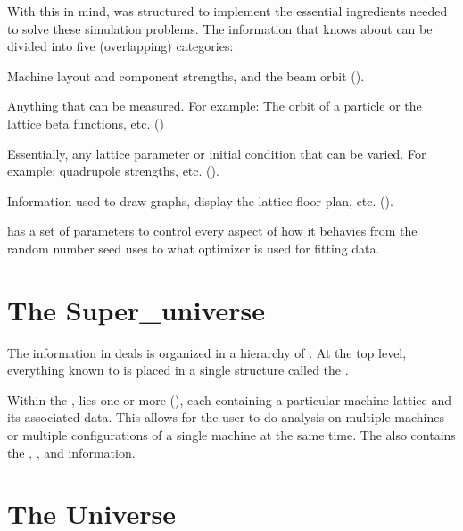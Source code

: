 With this in mind, \tao was structured to implement the essential
ingredients needed to solve these simulation problems.  
The information that \tao knows about can be divided into five
(overlapping) categories:
\begin{description}
  \item[Lattice] \Newline   
Machine layout and component strengths, and the beam orbit ().
  \item[Data] \Newline
Anything that can be measured.
For example: The orbit of a particle or the lattice beta 
functions, etc. ()
  \item[Variables] \Newline
Essentially, any lattice parameter or initial condition that can be varied.
For example: quadrupole strengths, etc. ().
  \item[Plotting]  \Newline
Information used to draw graphs, display the lattice 
floor plan, etc. ().
  \item[Global Parameters] \Newline
 \tao has a set of parameters to control every aspect of how it behavies from
the random number seed \tao uses to what optimizer is used for fitting data.
\end{description}

\section{The Super\_universe}
\label{s:super.uni}
The information in \tao deals is organized in a hierarchy of
. At the top level, everything known to \tao is
placed in a single structure called the .

Within the , lies one or more 
(), each  containing a particular
machine lattice and its associated data. This allows for the user to
do analysis on multiple machines or multiple configurations of a
single machine at the same time. The  also contains
the , , and  information.

\section{The Universe}
\label{s:universe}

